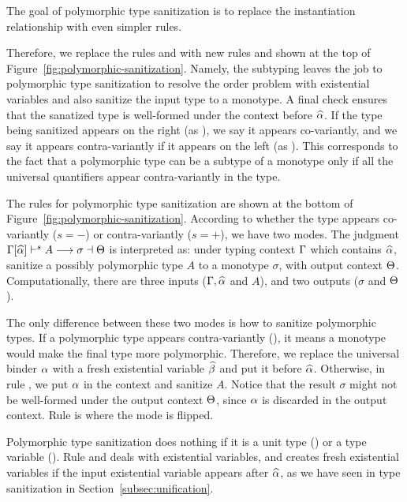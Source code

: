The goal of polymorphic type sanitization is to replace the instantiation
relationship with even simpler rules.

Therefore, we replace the rules  and  with new rules
 and  shown at the top of
Figure~\ref{fig:polymorphic-sanitization}. Namely, the subtyping leaves the job
to polymorphic type sanitization to resolve the order problem with existential
variables and also sanitize the input type to a monotype. A final check
ensures that the sanatized type is well-formed under the context before $\widehat{\alpha}$.
If the type being sanitized appears on the right (as ), we say it
appears co-variantly, and we say it appears contra-variantly if it appears on
the left (as ). This corresponds to the fact that a polymorphic type
can be a subtype of a monotype only if all the universal quantifiers appear
contra-variantly in the type.

The rules for polymorphic type sanitization are shown at the bottom of
Figure~\ref{fig:polymorphic-sanitization}. According to whether the type appears
co-variantly ($s = -$) or contra-variantly ($s = +$), we have two modes. The
judgment $\Gamma[\widehat{\alpha}] \vdash^{s} A \longrightarrow \sigma \dashv \Theta$ is interpreted as: under
typing context $\Gamma$ which contains $\widehat{\alpha}$, sanitize a possibly polymorphic
type $A$ to a monotype
$\sigma$, with output context $\Theta$. Computationally, there are three inputs
($\Gamma, \widehat{\alpha}$ and $A$), and two outputs ($\sigma$ and $\Theta$).

The only difference between these two modes is how to sanitize polymorphic
types. If a polymorphic type appears contra-variantly (), it
means a monotype would make the final type more polymorphic. Therefore, we
replace the universal binder $\alpha$ with a fresh existential variable $\widehat{\beta}$
and put it before $\widehat{\alpha}$. Otherwise, in rule , we put $\alpha$
in the context and sanitize $A$. Notice that the result $\sigma$ might not be
well-formed under the output context $\Theta$, since $\alpha$ is discarded in the
output context. Rule  is where the mode is flipped.

Polymorphic type sanitization does nothing if it is a unit type ()
or a type variable (). Rule  and
 deals with existential variables, and creates fresh
existential variables if the input existential variable appears after $\widehat{\alpha}$,
as we have seen in type sanitization in Section~\ref{subsec:unification}.

